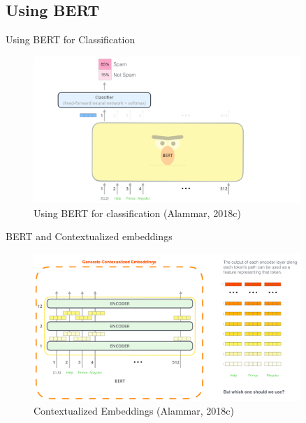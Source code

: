 \documentclass[10pt]{beamer}
\begin{document}
\subsection{Using BERT}

\begin{frame}{Using BERT for Classification}

\begin{figure}[h]
\centering
\includegraphics[width=0.9\textwidth]{fig/bert-classifier.png}
\caption{Using BERT for classification (Alammar, 2018c)}
\end{figure}

\end{frame}

\begin{frame}{BERT and Contextualized embeddings}

\begin{figure}[h]
\centering
\includegraphics[width=0.9\textwidth]{fig/bert-contexualized-embeddings.png}
\caption{Contextualized Embeddings (Alammar, 2018c)}
\end{figure}

\end{frame}
\end{document}
